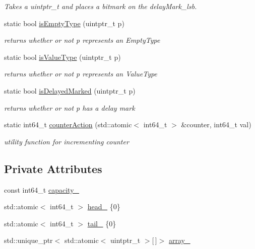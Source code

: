 \begin{DoxyCompactItemize}
\begin{DoxyCompactList}\small\item\em Takes a uintptr\+\_\+t and places a bitmark on the delay\+Mark\+\_\+lsb. \end{DoxyCompactList}\item 
static bool \hyperlink{classtervel_1_1containers_1_1wf_1_1_ring_buffer_afa26a1ffab8e479f7c8158789d05a2ed}{is\+Empty\+Type} (uintptr\+\_\+t p)
\begin{DoxyCompactList}\small\item\em returns whether or not p represents an Empty\+Type \end{DoxyCompactList}\item 
static bool \hyperlink{classtervel_1_1containers_1_1wf_1_1_ring_buffer_aa6254103b63556a143f568a23a189193}{is\+Value\+Type} (uintptr\+\_\+t p)
\begin{DoxyCompactList}\small\item\em returns whether or not p represents an Value\+Type \end{DoxyCompactList}\item 
static bool \hyperlink{classtervel_1_1containers_1_1wf_1_1_ring_buffer_ac0d773c57b2c0718e1308cbc5726f0a8}{is\+Delayed\+Marked} (uintptr\+\_\+t p)
\begin{DoxyCompactList}\small\item\em returns whether or not p has a delay mark \end{DoxyCompactList}\item 
static int64\+\_\+t \hyperlink{classtervel_1_1containers_1_1wf_1_1_ring_buffer_ae432cff608036acb82351fb37df2201e}{counter\+Action} (std\+::atomic$<$ int64\+\_\+t $>$ \&counter, int64\+\_\+t val)
\begin{DoxyCompactList}\small\item\em utility function for incrementing counter \end{DoxyCompactList}\end{DoxyCompactItemize}
\subsection*{Private Attributes}
\begin{DoxyCompactItemize}
\item 
const int64\+\_\+t \hyperlink{classtervel_1_1containers_1_1wf_1_1_ring_buffer_a41e3b8510f4ffd470709fe8e83868933}{capacity\+\_\+}
\item 
std\+::atomic$<$ int64\+\_\+t $>$ \hyperlink{classtervel_1_1containers_1_1wf_1_1_ring_buffer_a94a7b260355e3e1c3c97b649304b3302}{head\+\_\+} \{0\}
\item 
std\+::atomic$<$ int64\+\_\+t $>$ \hyperlink{classtervel_1_1containers_1_1wf_1_1_ring_buffer_acd823ce60f711bf6ea20799992844183}{tail\+\_\+} \{0\}
\item 
std\+::unique\+\_\+ptr$<$ std\+::atomic$<$ uintptr\+\_\+t $>$\mbox{[}$\,$\mbox{]}$>$ \hyperlink{classtervel_1_1containers_1_1wf_1_1_ring_buffer_a609506aa3f330fcf9ada6ca622514bd5}{array\+\_\+}
\end{DoxyCompactItemize}
